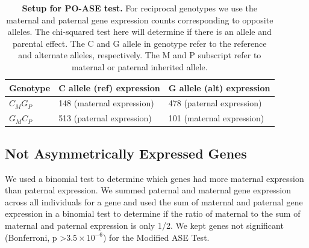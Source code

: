 \begin{table}[!htb]
\centering
\begin{tabular}{@{}p{3cm}|p{5cm}p{5cm}@{}}
 \toprule  Genotype & C allele (ref) expression & G allele (alt) expression \\ \midrule
 $C_{M}G_{P}$ & 148  (maternal expression) & 478 (paternal expression) \\
 $G_{M}C_{P}$ & 513 (paternal expression) & 101 (maternal expression) \\
 \bottomrule
\end{tabular}
\caption[Setup for PO-ASE test.]{\textbf{Setup for PO-ASE test.} For reciprocal genotypes we use the maternal and paternal gene expression counts corresponding to opposite alleles. The chi-squared test here will determine if there is an allele and parental effect. The C and G allele in genotype refer to the reference and alternate alleles, respectively. The M and P subscript refer to maternal or paternal inherited allele.}
\label{tab:chi}
\end{table}



\subsection{Not Asymmetrically Expressed Genes}\label{Not Asymmetrically Expressed Genes}
We used a binomial test to determine which genes had more maternal expression than paternal expression. We summed paternal and maternal gene expression across all individuals for a gene and used the sum of maternal and paternal gene expression in a binomial test to determine if the ratio of maternal to the sum of maternal and paternal expression is only 1/2. We kept genes not significant (Bonferroni, p \textgreater $3.5 \times 10^{-6}$) for the Modified ASE Test. 




